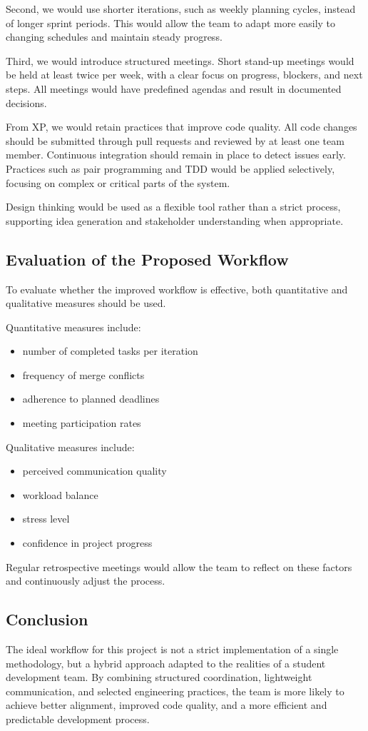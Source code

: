 Second, we would use shorter iterations, such as weekly planning cycles,
instead of longer sprint periods.
This would allow the team to adapt more easily to changing schedules
and maintain steady progress.

Third, we would introduce structured meetings.
Short stand-up meetings would be held at least twice per week,
with a clear focus on progress, blockers, and next steps.
All meetings would have predefined agendas and result in documented decisions.

From XP, we would retain practices that improve code quality.
All code changes should be submitted through pull requests
and reviewed by at least one team member.
Continuous integration should remain in place to detect issues early.
Practices such as pair programming and TDD would be applied selectively,
focusing on complex or critical parts of the system.

Design thinking would be used as a flexible tool rather than a strict process,
supporting idea generation and stakeholder understanding when appropriate.

\subsection{Evaluation of the Proposed Workflow}

To evaluate whether the improved workflow is effective,
both quantitative and qualitative measures should be used.

Quantitative measures include:
\begin{itemize}
    \item number of completed tasks per iteration
    \item frequency of merge conflicts
    \item adherence to planned deadlines
    \item meeting participation rates
\end{itemize}

Qualitative measures include:
\begin{itemize}
    \item perceived communication quality
    \item workload balance
    \item stress level
    \item confidence in project progress
\end{itemize}

Regular retrospective meetings would allow the team to reflect on these factors
and continuously adjust the process.

\subsection{Conclusion}

The ideal workflow for this project is not a strict implementation of a single methodology,
but a hybrid approach adapted to the realities of a student development team.
By combining structured coordination, lightweight communication,
and selected engineering practices,
the team is more likely to achieve better alignment, improved code quality,
and a more efficient and predictable development process.

